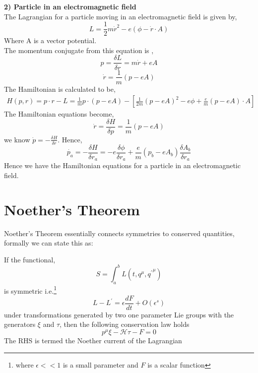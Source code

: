 \begin{tcolorbox}
    \textbf{2) Particle in an electromagnetic field} \\
    The Lagrangian for a particle moving in an electromagnetic field is given by, 
    \begin{equation}
        L = \frac{1}{2} m \dot{r}^{2} - e(\phi - \dot{r} \cdot A)
    \end{equation}
    Where A is a vector potential. \\ 
    The momentum conjugate from this equation is , 
    \begin{equation}
        p = \frac{\delta L}{\delta r} = m \dot{r} + eA
    \end{equation}
    \begin{equation}
        \dot{r} = \frac{1}{m} (p - eA)
    \end{equation}
    The Hamiltonian is calculated to be, 
    \begin{gather}
        H(p,r) = p \cdot r - L
        = \frac{1}{m} p \cdot (p - eA) - [\frac{1}{2m} (p-eA)^{2}- e \phi + \frac{e}{m} (p - eA) \cdot A]
    \end{gather}
    The Hamiltonian equations become, 
    \begin{equation}
        \dot{r} = \frac{\delta H}{\delta p} = \frac{1}{m} (p-eA)
    \end{equation}
    we know $\dot{p} = -\frac{\delta H}{\delta r}$. Hence, 
    \begin{equation}
        \dot{p_{a}} = - \frac{\delta H}{\delta r_{a}} = -e\frac{\delta \phi}{\delta r_{a}} + \frac{e}{m} (p_{b}- eA_{b})\frac{\delta A_{b}}{\delta r_{a}}
    \end{equation}
    Hence we have the Hamiltonian equations for a particle in an electromagnetic field.  
\end{tcolorbox}
	   
	
	  
		    	
		
		
		
\section{Noether's Theorem}
Noether's Theorem essentially connects symmetries to conserved quantities, formally we can state this as:
\begin{tcolorbox}
    If the functional,
    \begin{equation}
        S = \int_{a}^{b}L(t,q^{\mu},{q^{'}}^{\mu})
    \end{equation}
    is symmetric i.e.\footnote{where $\epsilon << 1$ is a small parameter and $F$ is a scalar function}
    \begin{equation}
        L - L^{'} = \epsilon \frac{dF}{dt} + O(\epsilon^{s})
    \end{equation}
     under transformations generated by two one parameter Lie groups with the generators $\xi$ and $\tau$, then the following conservation law holds
    \begin{equation}
            p^{\mu}\xi - \mathcal{H}\tau - F = 0
    \end{equation}
    The RHS is termed the Noether current of the Lagrangian
\end{tcolorbox}
